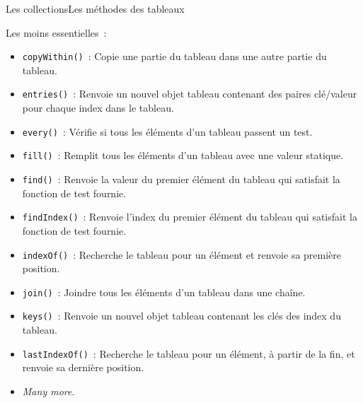 \documentclass{beamer}
\begin{document}
    \begin{frame}{Les collections}{Les méthodes des tableaux}
        \begin{footnotesize}
            Les moins essentielles~:
            \begin{itemize}
                \item \lstinline{copyWithin()}~: Copie une partie du tableau dans une autre partie du tableau.
                \item \lstinline{entries()}~: Renvoie un nouvel objet tableau contenant des paires clé/valeur pour chaque index dans le tableau.
                \item \lstinline{every()}~: Vérifie si tous les éléments d'un tableau passent un test.
                \item \lstinline{fill()}~: Remplit tous les éléments d'un tableau avec une valeur statique.
                \item \lstinline{find()}~: Renvoie la valeur du premier élément du tableau qui satisfait la fonction de test fournie.
                \item \lstinline{findIndex()}~: Renvoie l'index du premier élément du tableau qui satisfait la fonction de test fournie.
                \item \lstinline{indexOf()}~: Recherche le tableau pour un élément et renvoie sa première position.
                \item \lstinline{join()}~: Joindre tous les éléments d'un tableau dans une chaîne.
                \item \lstinline{keys()}~: Renvoie un nouvel objet tableau contenant les clés des index du tableau.
                \item \lstinline{lastIndexOf()}~: Recherche le tableau pour un élément, à partir de la fin, et renvoie sa dernière position.
                \item \textit{Many more}.
            \end{itemize}
        \end{footnotesize}
    \end{frame}
\end{document}
